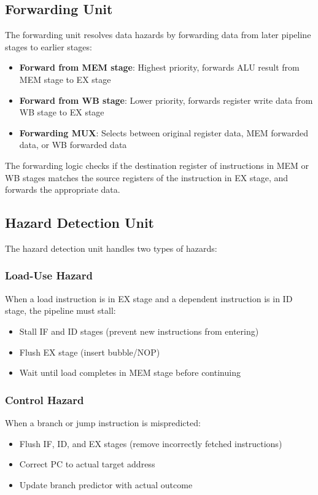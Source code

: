\subsection{Forwarding Unit}

The forwarding unit resolves data hazards by forwarding data from later pipeline stages to earlier stages:

\begin{itemize}
    \item \textbf{Forward from MEM stage}: Highest priority, forwards ALU result from MEM stage to EX stage
    \item \textbf{Forward from WB stage}: Lower priority, forwards register write data from WB stage to EX stage
    \item \textbf{Forwarding MUX}: Selects between original register data, MEM forwarded data, or WB forwarded data
\end{itemize}

The forwarding logic checks if the destination register of instructions in MEM or WB stages matches the source registers of the instruction in EX stage, and forwards the appropriate data.

\subsection{Hazard Detection Unit}

The hazard detection unit handles two types of hazards:

\subsubsection{Load-Use Hazard}
When a load instruction is in EX stage and a dependent instruction is in ID stage, the pipeline must stall:
\begin{itemize}
    \item Stall IF and ID stages (prevent new instructions from entering)
    \item Flush EX stage (insert bubble/NOP)
    \item Wait until load completes in MEM stage before continuing
\end{itemize}

\subsubsection{Control Hazard}
When a branch or jump instruction is mispredicted:
\begin{itemize}
    \item Flush IF, ID, and EX stages (remove incorrectly fetched instructions)
    \item Correct PC to actual target address
    \item Update branch predictor with actual outcome
\end{itemize}

